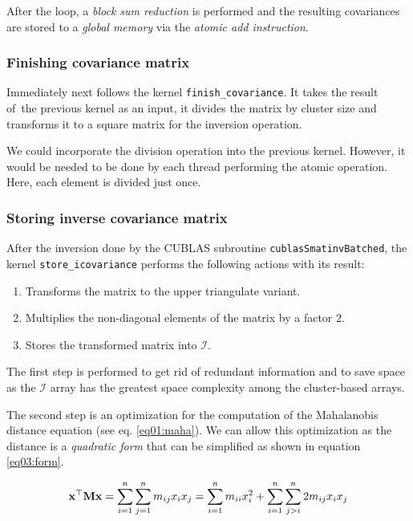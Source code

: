 After the loop, a \emph{block sum reduction} is performed and the resulting covariances are stored to a \emph{global memory} via the \emph{atomic add instruction}.

\subsubsection{Finishing covariance matrix}
Immediately next follows the kernel \texttt{finish\_covariance}. It takes the result of~the previous kernel as an input, it divides the matrix by cluster size and transforms it to a square matrix for the inversion operation.

We could incorporate the division operation into the previous kernel. However, it would be needed to be done by each thread performing the atomic operation. Here, each element is divided just once.

\subsubsection{Storing inverse covariance matrix}
After the inversion done by the CUBLAS subroutine \texttt{cublasSmatinvBatched}, the kernel \texttt{store\_icovariance} performs the following actions with its result:
\begin{enumerate}
	\item Transforms the matrix to the upper triangulate variant.
	\item Multiplies the non-diagonal elements of the matrix by a factor $2$.
	\item Stores the transformed matrix into $\mathcal{I}$.
\end{enumerate}

The first step is performed to get rid of redundant information and to save space as the $\mathcal{I}$ array has the greatest space complexity among the cluster-based arrays.

The second step is an optimization for the computation of the Mahalanobis distance equation (see eq. \ref{eq01:maha}). We can allow this optimization as the distance is a \emph{quadratic form} that can be simplified as shown in equation \ref{eq03:form}.

\begin{equation}
\mathbf{x}^\top\mathbf{M}\mathbf{x} = \sum_{i=1}^{n}\sum_{j=1}^{n}{m_{ij}x_ix_j} = \sum_{i=1}^{n}{m_{ii}x_i^2} + \sum_{i=1}^{n}\sum_{j>i}^{n}{2m_{ij}x_ix_j}
\label{eq03:form}
\end{equation}



